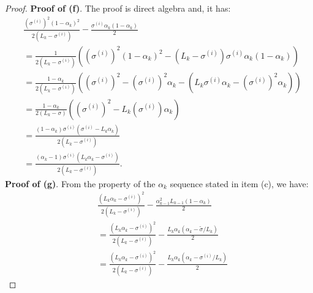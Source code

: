 \documentclass[12pt]{article}
\begin{document}
\begin{proof}
        \textbf{Proof of (f)}. 
        The proof is direct algebra and, it has: 
        {\small\allowdisplaybreaks
        \begin{align*}
            & \frac{\left(\sigma^{(i)}\right)^2(1 - \alpha_k)^2}{2(L_k - \sigma^{(i)})} 
            - \frac{\sigma^{(i)}\alpha_k(1 - \alpha_k)}{2}
            \\
            &= 
            \frac{1}{2\left(L_k - \sigma^{(i)}\right)}
            \left(
                \left(\sigma^{(i)}\right)^2(1 - \alpha_k)^2
                - \left(L_k - \sigma^{(i)}\right)\sigma^{(i)} \alpha_k(1 - \alpha_k)
            \right)
            \\
            &= \frac{1 - \alpha_k}{2\left(L_k - \sigma^{(i)}\right)}\left(
                \left(\sigma^{(i)}\right)^2 
                - \left(\sigma^{(i)}\right)^2\alpha_k 
                - \left(L_k \sigma^{(i)} \alpha_k - \left(\sigma^{(i)}\right)^2 \alpha_k\right)
            \right)
            \\
            &= 
            \frac{1 - \alpha_k}{2(L_k - \sigma)}\left(
                \left(\sigma^{(i)}\right)^2 - L_k\left(\sigma^{(i)}\right)\alpha_k
            \right)
            \\
            &= 
            \frac{(1 - \alpha_k)\sigma^{(i)}\left(\sigma^{(i)} - L_k\alpha_k\right)}
            {2\left(L_k - \sigma^{(i)}\right)}
            \\
            &= \frac{(\alpha_k - 1)\sigma^{(i)}\left(L_k\alpha_k - \sigma^{(i)}\right)}
            {2\left(L_k - \sigma^{(i)}\right)}. 
        \end{align*}
        }    
        \textbf{Proof of (g)}.
        From the property of the $\alpha_k$ sequence stated in item (c), we have: 
        {\allowdisplaybreaks
        \begin{align*}
            &\frac{\left(
                L_k\alpha_k - \sigma^{(i)}
            \right)^2}{2(L_k - \sigma^{(i)})} 
            -
            \frac{\alpha_{k - 1}^2L_{k - 1}(1 - \alpha_k)}{2} 
            \\
            &= 
            \frac{\left(
                L_k\alpha_k - \sigma^{(i)}
            \right)^2}{2(L_k - \sigma^{(i)})} 
            -
            \frac{L_k\alpha_k(\alpha_k - \tilde \sigma/L_k)}{2} 
            \\
            &=
            \frac{\left(
                L_k\alpha_k - \sigma^{(i)}
            \right)^2}{2(L_k - \sigma^{(i)})} 
            - \frac{L_k\alpha_k(\alpha_k - \sigma^{(i)}/L_k)}{2}

\end{align*}}
\end{proof}
\end{document}

